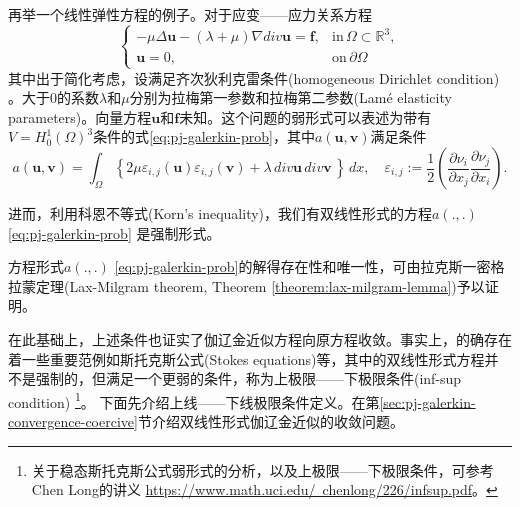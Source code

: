 \begin{subappendices}
再举一个线性弹性方程的例子。对于应变——应力关系方程
\begin{equation*}
  \begin{cases}
    - \mu \Delta \bm{u} - (\lambda + \mu) \nabla div \bm{u} = \bm{f}, & \text{in} \, \Omega \subset \mathbb{R}^3, \\
    \bm{u} = 0, & \text{on} \, \partial \Omega
  \end{cases}
\end{equation*}
其中出于简化考虑，设满足齐次狄利克雷条件(homogeneous Dirichlet condition) 。大于$0$的系数$\lambda$和$\mu$分别为拉梅第一参数和拉梅第二参数(Lamé elasticity parameters)。向量方程$\bm{u}$和$\bm{f}$未知。这个问题的弱形式可以表述为带有$V = H_{0}^{1} (\Omega)^3$条件的式\eqref{eq:pj-galerkin-prob}，其中$a(\bm{u},\bm{v})$满足条件
\begin{equation*}
  a(\bm{u},\bm{v}) = \int_{\Omega} \left\{ 2 \mu \varepsilon_{i,j}(\bm{u}) \varepsilon_{i,j}(\bm{v}) + \lambda \, div \bm{u} \, div \bm{v} \, \right\} \, dx, \quad \varepsilon_{i,j} := \frac{1}{2} \left( \frac{\partial \nu_i}{\partial x_j} \frac{\partial \nu_j}{\partial x_i}\right).
\end{equation*}

进而，利用科恩不等式(Korn's inequality)，我们有双线性形式的方程$a(.,.)$ \eqref{eq:pj-galerkin-prob} 是强制形式。

方程形式$a(.,.)$ \eqref{eq:pj-galerkin-prob}的解得存在性和唯一性，可由拉克斯一密格拉蒙定理(Lax-Milgram theorem, Theorem \ref{theorem:lax-milgram-lemma})予以证明。

在此基础上，上述条件也证实了伽辽金近似方程向原方程收敛。事实上，的确存在着一些重要范例如斯托克斯公式(Stokes equations)等，其中的双线性形式方程并不是强制的，但满足一个更弱的条件，称为上极限——下极限条件(inf-sup condition) \footnote{关于稳态斯托克斯公式弱形式的分析，以及上极限——下极限条件，可参考Chen Long的讲义 \href{https://www.math.uci.edu/~chenlong/226/infsup.pdf}{https://www.math.uci.edu/~chenlong/226/infsup.pdf}。}。
下面先介绍上线——下线极限条件定义。在第\ref{sec:pj-galerkin-convergence-coercive}节介绍双线性形式伽辽金近似的收敛问题。

\begin{definition}


\end{definition}
\end{subappendices}
